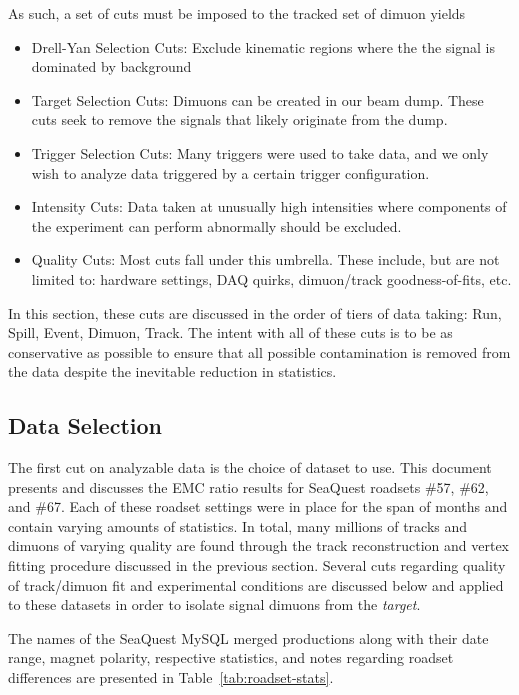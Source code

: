 As such, a set of cuts must be imposed to the tracked set of dimuon yields
\begin{itemize}
	\item Drell-Yan Selection Cuts: Exclude kinematic regions where the the signal is dominated by background
	\item Target Selection Cuts: Dimuons can be created in our beam dump. These cuts seek to remove the signals that likely originate from the dump.
	\item Trigger Selection Cuts: Many triggers were used to take data, and we only wish to analyze data triggered by a certain trigger configuration.
	\item Intensity Cuts: Data taken at unusually high intensities where components of the experiment can perform abnormally should be excluded.
	\item Quality Cuts: Most cuts fall under this umbrella. These include, but are not limited to: hardware settings, DAQ quirks, dimuon/track goodness-of-fits, etc.
\end{itemize}

In this section, these cuts are discussed in the order of tiers of data taking: Run, Spill, Event, Dimuon, Track. The intent with all of these cuts is to be as conservative as possible to ensure that all possible contamination is removed from the data despite the inevitable reduction in statistics.

\subsection{Data Selection}

The first cut on analyzable data is the choice of dataset to use. This document presents and discusses the EMC ratio results for SeaQuest roadsets \#57, \#62, and \#67. Each of these roadset settings were in place for the span of months and contain varying amounts of statistics. In total, many millions of tracks and dimuons of varying quality are found through the track reconstruction and vertex fitting procedure discussed in the previous section. Several cuts regarding quality of track/dimuon fit and experimental conditions are discussed below and applied to these datasets in order to isolate signal dimuons from the \emph{target}.

The names of the SeaQuest MySQL merged productions along with their date range, magnet polarity, respective statistics, and notes regarding roadset differences are presented in Table~\ref{tab:roadset-stats}.

